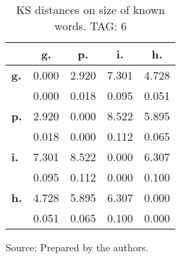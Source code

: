 \begin{table}[h!]
\begin{center}
\caption{KS distances on size of known words. TAG: 6}
\begin{tabular}{| l || c | c | c | c |}\hline
 & {\bf g.} & {\bf p.} & {\bf i.} & {\bf h.} \\\hline\hline
{\bf g.} & 0.000 & 2.920 & 7.301 & 4.728 \\
{\bf } & 0.000 & 0.018 & 0.095 & 0.051 \\\hline
{\bf p.} & 2.920 & 0.000 & 8.522 & 5.895 \\
{\bf } & 0.018 & 0.000 & 0.112 & 0.065 \\\hline
{\bf i.} & 7.301 & 8.522 & 0.000 & 6.307 \\
{\bf } & 0.095 & 0.112 & 0.000 & 0.100 \\\hline
{\bf h.} & 4.728 & 5.895 & 6.307 & 0.000 \\
{\bf } & 0.051 & 0.065 & 0.100 & 0.000 \\\hline
\end{tabular}
\begin{flushleft}
		Source: Prepared by the authors.\
\end{flushleft}
\end{center}
\end{table}
